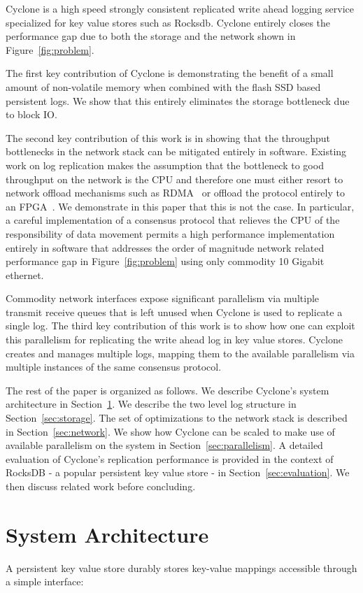 \documentclass[letterpaper,twocolumn,10pt]{article}
\begin{document}
Cyclone is a high speed strongly consistent replicated write ahead logging
service specialized for key value stores such as Rocksdb. Cyclone entirely
closes the performance gap due to both the storage and the network shown in
Figure~\ref{fig:problem}.

The first key contribution of Cyclone is demonstrating the benefit of
a small amount of non-volatile memory when combined with the flash SSD
based persistent logs. We show that this entirely eliminates the
storage bottleneck due to block IO.
 
The second key contribution of this work is in showing that the
throughput bottlenecks in the network stack can be mitigated entirely
in software. Existing work on log replication makes the assumption
that the bottleneck to good throughput on the network is the CPU and
therefore one must either resort to network offload mechanisms such as
RDMA~\cite{dare, farm, faast} or offload the protocol entirely to an
FPGA~\cite{consensus_box}. We demonstrate in this paper that this is
not the case. In particular, a careful implementation of a consensus
protocol that relieves the CPU of the responsibility of data movement
permits a high performance implementation entirely in software that
addresses the order of magnitude network related performance gap in
Figure~\ref{fig:problem} using only commodity 10 Gigabit ethernet.

Commodity network interfaces expose significant parallelism via
multiple transmit receive queues that is left unused when Cyclone is
used to replicate a single log. The third key contribution of this
work is to show how one can exploit this parallelism for replicating
the write ahead log in key value stores. Cyclone creates and manages
multiple logs, mapping them to the available parallelism via multiple
instances of the same consensus protocol.

The rest of the paper is organized as follows. We describe Cyclone's system
architecture in Section~\ref{sec:sysarch}. We describe the two level log
structure in Section~\ref{sec:storage}. The set of optimizations to the network
stack is described in Section~\ref{sec:network}. We show how Cyclone can be
scaled to make use of available parallelism on the system in
Section~\ref{sec:parallelism}. A detailed evaluation of Cyclone's replication
performance is provided in the context of RocksDB - a popular persistent key
value store - in Section~\ref{sec:evaluation}. We then discuss related work
before concluding.

\section{System Architecture}
\label{sec:sysarch}
A persistent key value store durably stores key-value mappings accessible
through a simple interface:
\end{document}
